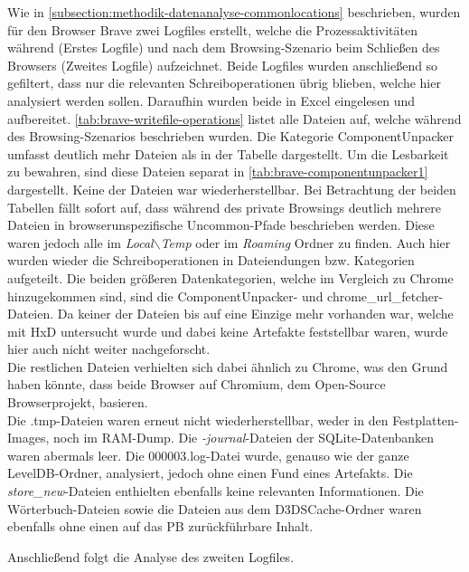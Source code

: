 \begin{appendices}
Wie in \autoref{subsection:methodik-datenanalyse-commonlocations} beschrieben, wurden für den Browser Brave zwei Logfiles erstellt, welche die Prozessaktivitäten während (Erstes Logfile) und nach dem Browsing-Szenario beim Schließen des Browsers (Zweites Logfile) aufzeichnet. Beide Logfiles wurden anschließend so gefiltert, dass nur die relevanten Schreiboperationen übrig blieben, welche hier analysiert werden sollen. Daraufhin wurden beide in Excel eingelesen und aufbereitet. \autoref{tab:brave-writefile-operations} listet alle Dateien auf, welche während des Browsing-Szenarios beschrieben wurden. Die Kategorie \glqq{}ComponentUnpacker\grqq{} umfasst deutlich mehr Dateien als in der Tabelle dargestellt. Um die Lesbarkeit zu bewahren, sind diese Dateien separat in \autoref{tab:brave-componentunpacker1} dargestellt. Keine der Dateien war wiederherstellbar.
Bei Betrachtung der beiden Tabellen fällt sofort auf, dass während des private Browsings deutlich mehrere Dateien in browserunspezifische \glqq{}Uncommon\grqq{}-Pfade beschrieben werden. Diese waren jedoch alle im \textit{Local$\backslash$Temp} oder im \textit{Roaming} Ordner zu finden. Auch hier wurden wieder die Schreiboperationen in Dateiendungen bzw. Kategorien aufgeteilt. Die beiden größeren Datenkategorien, welche im Vergleich zu Chrome hinzugekommen sind, sind die \glqq{}ComponentUnpacker\grqq{}- und \glqq{}chrome\_url\_fetcher\grqq{}-Dateien. Da keiner der Dateien bis auf eine Einzige mehr vorhanden war, welche mit HxD untersucht wurde und dabei keine Artefakte feststellbar waren, wurde hier auch nicht weiter nachgeforscht. \\
Die restlichen Dateien verhielten sich dabei ähnlich zu Chrome, was den Grund haben könnte, dass beide Browser auf Chromium, dem Open-Source Browserprojekt, basieren. \\
Die .tmp-Dateien waren erneut nicht wiederherstellbar, weder in den Festplatten-Images, noch im RAM-Dump. Die \textit{-journal}-Dateien der SQLite-Datenbanken waren abermals leer. Die 000003.log-Datei wurde, genauso wie der ganze LevelDB-Ordner, analysiert, jedoch ohne einen Fund eines Artefakts. Die \textit{store\_new}-Dateien enthielten ebenfalls keine relevanten Informationen. Die Wörterbuch-Dateien sowie die Dateien aus dem \glqq{}D3DSCache\grqq{}-Ordner waren ebenfalls ohne einen auf das PB zurückführbare Inhalt.

Anschließend folgt die Analyse des zweiten Logfiles.


\end{appendices}
